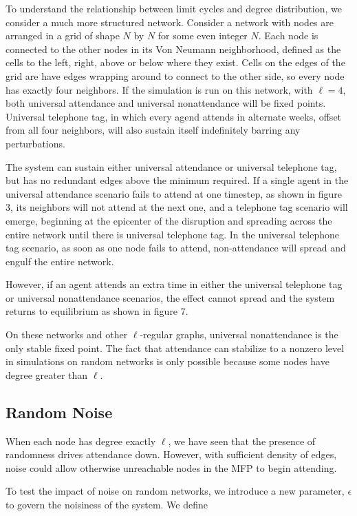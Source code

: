 \documentclass[12pt]{article}
\begin{document}
To understand the relationship between limit cycles and degree distribution, we consider a much more structured network.  Consider a network with nodes are arranged in a grid of shape $N$ by $N$ for some even integer $N$.  Each node is connected to the other nodes in its Von Neumann neighborhood, defined as the cells to the left, right, above or below where they exist.  Cells on the edges of the grid are have edges wrapping around to connect to the other side, so every node has exactly four neighbors.  If the simulation is run on this network, with $\ell = 4$, both universal attendance and universal nonattendance will be fixed points.  Universal telephone tag, in which every agend attends in alternate weeks, offset from all four neighbors, will also sustain itself indefinitely barring any perturbations.

The system can sustain either universal attendance or universal telephone tag, but has no redundant edges above the minimum required.  If a single agent in the universal attendance scenario fails to attend at one timestep, as shown in figure 3, its neighbors will not attend at the next one, and a telephone tag scenario will emerge, beginning at the epicenter of the disruption and spreading across the entire network until there is universal telephone tag.  In the universal telephone tag scenario, as soon as one node fails to attend, non-attendance will spread and engulf the entire network.

However, if an agent attends an extra time in either the universal telephone tag or universal nonattendance scenarios, the effect cannot spread and the system returns to equilibrium as shown in figure 7.

On these networks and other $\ell$-regular graphs, universal nonattendance is the only stable fixed point.  The fact that attendance can stabilize to a nonzero level in simulations on random networks is only possible because some nodes have degree greater than $\ell$.

\subsection{Random Noise}

When each node has degree exactly $\ell$, we have seen that the presence of randomness drives attendance down.  However, with sufficient density of edges, noise could allow otherwise unreachable nodes in the MFP to begin attending.

To test the impact of noise on random networks, we introduce a new parameter, $\epsilon$ to govern the noisiness of the system.  We define
\end{document}
